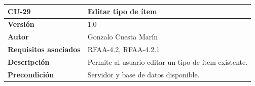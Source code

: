 \documentclass[
]{article}
\begin{document}
\begin{longtable}[]{@{}ll@{}}
\toprule
\begin{minipage}[b]{0.20\columnwidth}\raggedright
\textbf{CU-29}\strut
\end{minipage} & \begin{minipage}[b]{0.75\columnwidth}\raggedright
\textbf{Editar tipo de ítem}\strut
\end{minipage}\tabularnewline
\midrule
\endhead
\begin{minipage}[t]{0.20\columnwidth}\raggedright
\textbf{Versión}\strut
\end{minipage} & \begin{minipage}[t]{0.75\columnwidth}\raggedright
1.0\strut
\end{minipage}\tabularnewline
\begin{minipage}[t]{0.20\columnwidth}\raggedright
\textbf{Autor}\strut
\end{minipage} & \begin{minipage}[t]{0.75\columnwidth}\raggedright
Gonzalo Cuesta Marín\strut
\end{minipage}\tabularnewline
\begin{minipage}[t]{0.20\columnwidth}\raggedright
\textbf{Requisitos asociados}\strut
\end{minipage} & \begin{minipage}[t]{0.75\columnwidth}\raggedright
RFAA-4.2, RFAA-4.2.1\strut
\end{minipage}\tabularnewline
\begin{minipage}[t]{0.20\columnwidth}\raggedright
\textbf{Descripción}\strut
\end{minipage} & \begin{minipage}[t]{0.75\columnwidth}\raggedright
Permite al usuario editar un tipo de ítem existente.\strut
\end{minipage}\tabularnewline
\begin{minipage}[t]{0.20\columnwidth}\raggedright
\textbf{Precondición}\strut
\end{minipage} & \begin{minipage}[t]{0.75\columnwidth}\raggedright
Servidor y base de datos disponible.


\end{minipage}
\end{longtable}
\end{document}
